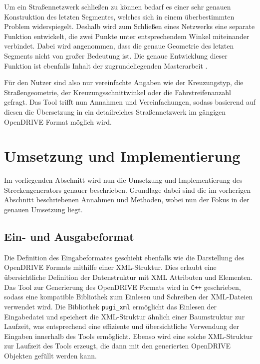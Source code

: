 Um ein Straßennetzwerk schließen zu können bedarf es einer sehr genauen Konstruktion des letzten Segmentes, welches sich in einem überbestimmten Problem widerspiegelt. Deshalb wird zum Schließen eines Netzwerks eine separate Funktion entwickelt, die zwei Punkte unter entsprechendem Winkel miteinander verbindet. Dabei wird angenommen, dass die genaue Geometrie des letzten Segments nicht von großer Bedeutung ist. Die genaue Entwicklung dieser Funktion ist ebenfalls Inhalt der zugrundeliegenden Masterarbeit \cite{Russ.2019}.

Für den Nutzer sind also nur vereinfachte Angaben wie der Kreuzungstyp, die Straßengeometrie, der Kreuzungsschnittwinkel oder die Fahrstreifenanzahl gefragt. Das Tool trifft nun Annahmen und Vereinfachungen, sodass basierend auf diesen die Übersetzung in ein detailreiches Straßennetzwerk im gängigen OpenDRIVE Format möglich wird.
\chapter{Umsetzung und Implementierung}
Im vorliegenden Abschnitt wird nun die Umsetzung und Implementierung des Streckengenerators genauer beschrieben. Grundlage dabei sind die im vorherigen Abschnitt beschriebenen Annahmen und Methoden, wobei nun der Fokus in der genauen Umsetzung liegt.

\section{Ein- und Ausgabeformat}
Die Definition des Eingabeformates geschieht ebenfalls wie die Darstellung des OpenDRIVE Formats mithilfe einer XML-Struktur. Dies erlaubt eine übersichtliche Definition der Datenstruktur mit XML Attributen und Elementen. Das Tool zur Generierung des OpenDRIVE Formats wird in \texttt{C++} geschrieben, sodass eine kompatible Bibliothek zum Einlesen und Schreiben der XML-Dateien verwendet wird. Die Bibliothek \texttt{pugi\_xml}\cite{pugixml.2019} ermöglicht das Einlesen der Eingabedatei und speichert die XML-Struktur ähnlich einer Baumstruktur zur Laufzeit, was entsprechend eine effiziente und übersichtliche Verwendung der Eingaben innerhalb des Tools ermöglicht. Ebenso wird eine solche XML-Struktur zur Laufzeit des Tools erzeugt, die dann mit den generierten OpenDRIVE Objekten gefüllt werden kann.

